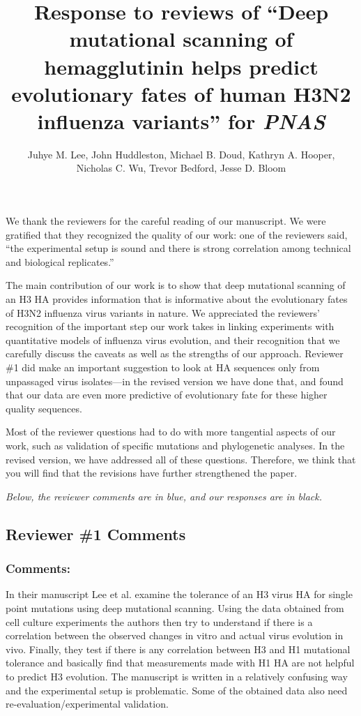 \documentclass[11pt, oneside]{article}   	%
\title{Response to reviews of ``Deep mutational scanning of hemagglutinin helps predict evolutionary fates of human H3N2 influenza variants'' for \textit{PNAS}}
\author{Juhye M. Lee, John Huddleston, Michael B. Doud, Kathryn A. Hooper,\\Nicholas C. Wu, Trevor Bedford, Jesse D. Bloom}
\begin{document}
\maketitle

We thank the reviewers for the careful reading of our manuscript.
We were gratified that they recognized the quality of our work: one of the reviewers said, ``the experimental setup is sound and there is strong correlation among technical and biological replicates.''

The main contribution of our work is to show that deep mutational scanning of an H3 HA provides information that is informative about the evolutionary fates of H3N2 influenza virus variants in nature.
We appreciated the reviewers' recognition of the important step our work takes in linking experiments with quantitative models of influenza virus evolution, and their recognition that we carefully discuss the caveats as well as the strengths of our approach.
Reviewer \#1 did make an important suggestion to look at HA sequences only from unpassaged virus isolates---in the revised version we have done that, and found that our data are even more predictive of evolutionary fate for these higher quality sequences.

Most of the reviewer questions had to do with more tangential aspects of our work, such as validation of specific mutations and phylogenetic analyses.
In the revised version, we have addressed all of these questions.
Therefore, we think that you will find that the revisions have further strengthened the paper.

\emph{Below, the reviewer comments {\color{blue} are in blue}, and our responses are in black.}

\color{blue}

\subsection*{Reviewer \#1 Comments}

\subsubsection*{Comments:} 
In their manuscript Lee et al. examine the tolerance of an H3 virus HA for single point mutations using deep mutational scanning. Using the data obtained from cell culture experiments the authors then try to understand if there is a correlation between the observed changes in vitro and actual virus evolution in vivo. Finally, they test if there is any correlation between H3 and H1 mutational tolerance and basically find that measurements made with H1 HA are not helpful to predict H3 evolution. The manuscript is written in a relatively confusing way and the experimental setup is problematic. Some of the obtained data also need re-evaluation/experimental validation. 
\end{document}
